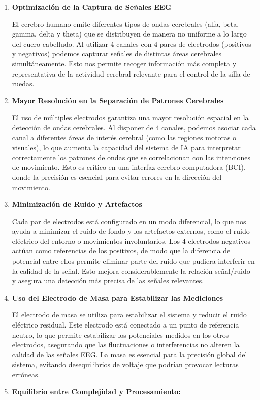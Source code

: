 \documentclass{article}
\begin{document}
\begin{enumerate}
    \item \textbf{Optimización de la Captura de Señales EEG} 
    
    El cerebro humano emite diferentes tipos de ondas cerebrales (alfa, beta, gamma, delta y theta) que se distribuyen de manera no uniforme a lo largo del cuero cabelludo. Al utilizar 4 canales con 4 pares de electrodos (positivos y negativos) podemos capturar señales de distintas áreas cerebrales simultáneamente. Esto nos permite recoger información más completa y representativa de la actividad cerebral relevante para el control de la silla de ruedas.
    \item \textbf{Mayor Resolución en la Separación de Patrones Cerebrales} 
    
    El uso de múltiples electrodos garantiza una mayor resolución espacial en la detección de ondas cerebrales. Al disponer de 4 canales, podemos asociar cada canal a diferentes áreas de interés cerebral (como las regiones motoras o visuales), lo que aumenta la capacidad del sistema de IA para interpretar correctamente los patrones de ondas que se correlacionan con las intenciones de movimiento. Esto es crítico en una interfaz cerebro-computadora (BCI), donde la precisión es esencial para evitar errores en la dirección del movimiento.
    \item \textbf{Minimización de Ruido y Artefactos} 
    
    Cada par de electrodos está configurado en un modo diferencial, lo que nos ayuda a minimizar el ruido de fondo y los artefactos externos, como el ruido eléctrico del entorno o movimientos involuntarios. Los 4 electrodos negativos actúan como referencias de los positivos, de modo que la diferencia de potencial entre ellos permite eliminar parte del ruido que pudiera interferir en la calidad de la señal. Esto mejora considerablemente la relación señal/ruido y asegura una detección más precisa de las señales relevantes.
    \item \textbf{Uso del Electrodo de Masa para Estabilizar las Mediciones }
    
    El electrodo de masa se utiliza para estabilizar el sistema y reducir el ruido eléctrico residual. Este electrodo está conectado a un punto de referencia neutro, lo que permite estabilizar los potenciales medidos en los otros electrodos, asegurando que las fluctuaciones o interferencias no alteren la calidad de las señales EEG. La masa es esencial para la precisión global del sistema, evitando desequilibrios de voltaje que podrían provocar lecturas erróneas.
    \item \textbf{Equilibrio entre Complejidad y Procesamiento:}
    

\end{enumerate}
\end{document}
